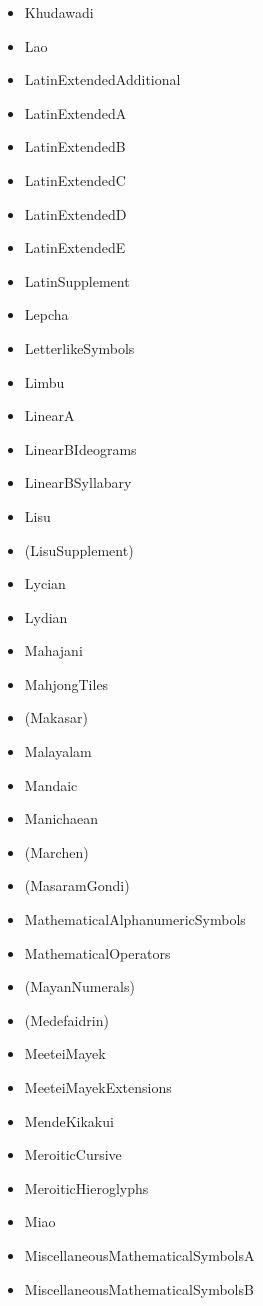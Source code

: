 \documentclass{article}
\newenvironment{itemlist}{%
  \begin{itemize}
  \setlength{\itemsep}{0pt}
  \setlength{\parsep}{0pt}
  \setlength{\topsep}{0pt}
  \setlength{\partopsep}{0pt}
  \setlength{\parskip}{0pt}
  \setlength{\labelsep}{5pt}}%
{
  \end{itemize}}
\begin{document}
\begin{multicols*}{2}
\begin{itemlist}
        \item Khudawadi
        \item Lao
        \item LatinExtendedAdditional
        \item LatinExtendedA
        \item LatinExtendedB
        \item LatinExtendedC
        \item LatinExtendedD
        \item LatinExtendedE
        \item LatinSupplement
        \item Lepcha
        \item LetterlikeSymbols
        \item Limbu
        \item LinearA
        \item LinearBIdeograms
        \item LinearBSyllabary
        \item Lisu
        \item (LisuSupplement)
        \item Lycian
        \item Lydian
        \item Mahajani
        \item MahjongTiles
        \item (Makasar)
        \item Malayalam
        \item Mandaic
        \item Manichaean
        \item (Marchen)
        \item (MasaramGondi)
        \item MathematicalAlphanumericSymbols
        \item MathematicalOperators
        \item (MayanNumerals)
        \item (Medefaidrin)
        \item MeeteiMayek
        \item MeeteiMayekExtensions
        \item MendeKikakui
        \item MeroiticCursive
        \item MeroiticHieroglyphs
        \item Miao
        \item MiscellaneousMathematicalSymbolsA
        \item MiscellaneousMathematicalSymbolsB

\end{itemlist}
\end{multicols*}
\end{document}
